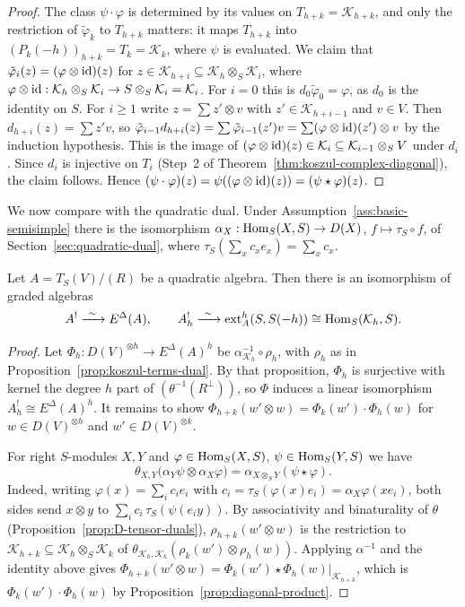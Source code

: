 \begin{proof}
The class $\psi\cdot\varphi$ is determined by its values on $T_{h+k}=\mathcal K_{h+k}$, and only the restriction of $\tilde\varphi_k$ to $T_{h+k}$ matters: it maps $T_{h+k}$ into $(P_k(-h))_{h+k}=T_k=\mathcal K_k$, where $\psi$ is evaluated.
We claim that $\tilde\varphi_i(z)=(\varphi\otimes\operatorname{id})(z)$ for $z\in\mathcal K_{h+i}\subseteq\mathcal K_h\otimes_S\mathcal K_i$, where $\varphi\otimes\operatorname{id}:\mathcal K_h\otimes_S\mathcal K_i\to S\otimes_S\mathcal K_i=\mathcal K_i$.
For $i=0$ this is $d_0\tilde\varphi_0=\varphi$, as $d_0$ is the identity on $S$.
For $i\geq1$ write $z=\sum z'\otimes v$ with $z'\in\mathcal K_{h+i-1}$ and $v\in V$.
Then $d_{h+i}(z)=\sum z'v$, so $\tilde\varphi_{i-1}d_{h+i}(z)=\sum\tilde\varphi_{i-1}(z')v=\sum(\varphi\otimes\operatorname{id})(z')\otimes v$ by the induction hypothesis.
This is the image of $(\varphi\otimes\operatorname{id})(z)\in\mathcal K_i\subseteq\mathcal K_{i-1}\otimes_SV$ under $d_i$.
Since $d_i$ is injective on $T_i$ (Step~2 of Theorem~\ref{thm:koszul-complex-diagonal}), the claim follows.
Hence $(\psi\cdot\varphi)(z)=\psi((\varphi\otimes\operatorname{id})(z))=(\psi\star\varphi)(z)$.
\end{proof}

We now compare with the quadratic dual.
Under Assumption~\ref{ass:basic-semisimple} there is the isomorphism $\alpha_X:\operatorname{Hom}\nolimits_S(X,S)\to D(X)$, $f\mapsto\tau_S\circ f$, of Section~\ref{sec:quadratic-dual}, where $\tau_S(\sum_xc_xe_x)=\sum_xc_x$.

\begin{theorem}\label{thm:yoneda-quadratic-dual}
Let $A=T_S(V)/(R)$ be a quadratic algebra.
Then there is an isomorphism of graded algebras
\[
A^!\xrightarrow{\ \sim\ }E^\Delta(A),\qquad A^!_h\xrightarrow{\ \sim\ }\operatorname{ext}\nolimits_A^h(S,S(-h))\cong\operatorname{Hom}\nolimits_S(\mathcal K_h,S).
\]
\end{theorem}

\begin{proof}
Let $\Phi_h:D(V)^{\otimes h}\to E^\Delta(A)^h$ be $\alpha_{\mathcal K_h}^{-1}\circ\rho_h$, with $\rho_h$ as in Proposition~\ref{prop:koszul-terms-dual}.
By that proposition, $\Phi_h$ is surjective with kernel the degree $h$ part of $(\theta^{-1}(R^\perp))$, so $\Phi$ induces a linear isomorphism $A^!_h\cong E^\Delta(A)^h$.
It remains to show $\Phi_{h+k}(w'\otimes w)=\Phi_k(w')\cdot\Phi_h(w)$ for $w\in D(V)^{\otimes h}$ and $w'\in D(V)^{\otimes k}$.

For right $S$-modules $X,Y$ and $\varphi\in\operatorname{Hom}\nolimits_S(X,S)$, $\psi\in\operatorname{Hom}\nolimits_S(Y,S)$ we have
\[
\theta_{X,Y}\bigl(\alpha_Y\psi\otimes\alpha_X\varphi\bigr)=\alpha_{X\otimes_SY}(\psi\star\varphi).
\]
Indeed, writing $\varphi(x)=\sum_ic_ie_i$ with $c_i=\tau_S(\varphi(x)e_i)=\alpha_X\varphi(xe_i)$, both sides send $x\otimes y$ to $\sum_ic_i\,\tau_S(\psi(e_iy))$.
By associativity and binaturality of $\theta$ (Proposition~\ref{prop:D-tensor-duals}), $\rho_{h+k}(w'\otimes w)$ is the restriction to $\mathcal K_{h+k}\subseteq\mathcal K_h\otimes_S\mathcal K_k$ of $\theta_{\mathcal K_h,\mathcal K_k}(\rho_k(w')\otimes\rho_h(w))$.
Applying $\alpha^{-1}$ and the identity above gives $\Phi_{h+k}(w'\otimes w)=\Phi_k(w')\star\Phi_h(w)|_{\mathcal K_{h+k}}$, which is $\Phi_k(w')\cdot\Phi_h(w)$ by Proposition~\ref{prop:diagonal-product}.
\end{proof}

